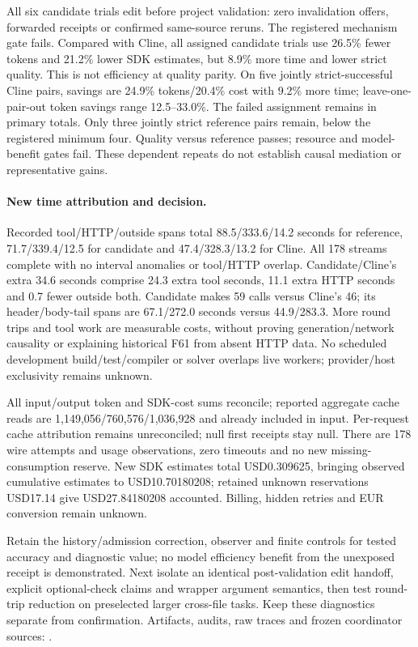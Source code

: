 \documentclass[11pt,a4paper]{article}
\newcommand{\filepath}[1]{\path{#1}}
\begin{document}
All six candidate trials edit before project validation: zero invalidation offers,
forwarded receipts or confirmed same-source reruns. The registered mechanism gate
fails. Compared with Cline, all assigned candidate trials use 26.5\% fewer tokens
and 21.2\% lower SDK estimates, but 8.9\% more time and lower strict quality.
This is not efficiency at quality parity. On five jointly strict-successful Cline
pairs, savings are 24.9\% tokens/20.4\% cost with 9.2\% more time; leave-one-pair-out
token savings range 12.5--33.0\%. The failed assignment remains in primary totals.
Only three jointly strict reference pairs remain, below the registered minimum
four. Quality versus reference passes; resource and model-benefit gates fail.
These dependent repeats do not establish causal mediation or representative gains.

\paragraph{New time attribution and decision.}
Recorded tool/HTTP/outside spans total 88.5/333.6/14.2 seconds for reference,
71.7/339.4/12.5 for candidate and 47.4/328.3/13.2 for Cline. All 178 streams complete
with no interval anomalies or tool/HTTP overlap. Candidate/Cline's extra 34.6
seconds comprise 24.3 extra tool seconds, 11.1 extra HTTP seconds and 0.7 fewer
outside both. Candidate makes 59 calls versus Cline's 46; its header/body-tail
spans are 67.1/272.0 seconds versus 44.9/283.3. More round trips and tool work
are measurable costs, without proving generation/network causality or explaining
historical F61 from absent HTTP data. No scheduled development build/test/compiler
or solver overlaps live workers; provider/host exclusivity remains unknown.

All input/output token and SDK-cost sums reconcile; reported aggregate cache reads
are 1,149,056/760,576/1,036,928 and already included in input. Per-request cache
attribution remains unreconciled; null first receipts stay null. There are 178
wire attempts and usage observations, zero timeouts and no new missing-consumption
reserve. New SDK estimates total USD0.309625, bringing observed cumulative estimates
to USD10.70180208; retained unknown reservations USD17.14 give USD27.84180208
accounted. Billing, hidden retries and EUR conversion remain unknown.

Retain the history/admission correction, observer and finite controls for tested
accuracy and diagnostic value; no model efficiency benefit from the unexposed
receipt is demonstrated. Next isolate an identical post-validation edit handoff,
explicit optional-check claims and wrapper argument semantics, then test round-trip
reduction on preselected larger cross-file tasks. Keep these diagnostics separate
from confirmation. Artifacts, audits, raw traces and frozen coordinator sources:
\filepath{docs/experiments/light-harness-feedback-f62-2026-10-18}.
\end{document}
